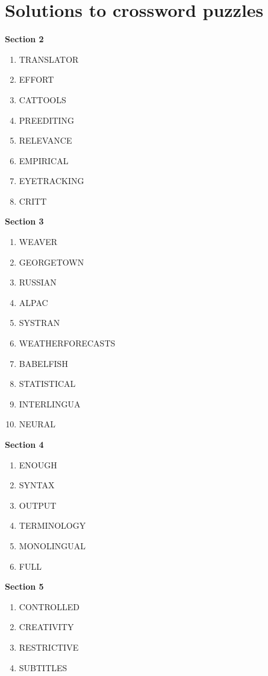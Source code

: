 \newpage

\section*{Solutions to crossword puzzles}

\textbf{Section 2}

\begin{enumerate}
  \item TRANSLATOR
  \item EFFORT
  \item CATTOOLS
  \item PREEDITING
  \item RELEVANCE
  \item EMPIRICAL
  \item EYETRACKING
  \item CRITT
\end{enumerate}

\textbf{Section 3}

\begin{enumerate}
  \item WEAVER
  \item GEORGETOWN
  \item RUSSIAN
  \item ALPAC
  \item SYSTRAN
  \item WEATHERFORECASTS
  \item BABELFISH
  \item STATISTICAL
  \item INTERLINGUA
  \item NEURAL
\end{enumerate}

\textbf{Section 4}

\begin{enumerate}
    \item ENOUGH
    \item SYNTAX
    \item OUTPUT
    \item TERMINOLOGY
    \item MONOLINGUAL
    \item FULL
\end{enumerate}

\textbf{Section 5}

\begin{enumerate}
    \item CONTROLLED
    \item CREATIVITY
    \item RESTRICTIVE
    \item SUBTITLES
\end{enumerate}

